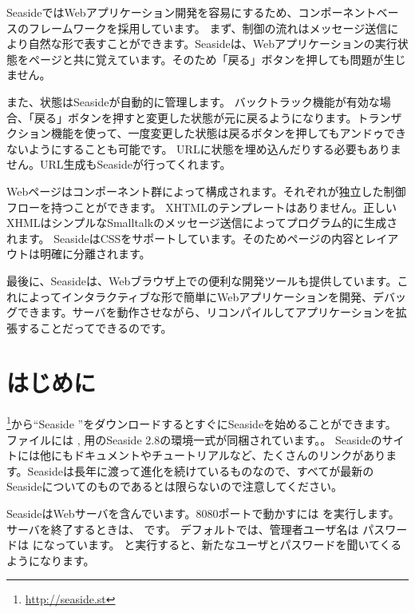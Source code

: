\documentclass[a4paper,10pt,twoside]{book}
\begin{document}
SeasideではWebアプリケーション開発を容易にするため、コンポーネントベースのフレームワークを採用しています。
まず、制御の流れはメッセージ送信により自然な形で表すことができます。Seasideは、Webアプリケーションの実行状態をページと共に覚えています。そのため「戻る」ボタンを押しても問題が生じません。

また、状態はSeasideが自動的に管理します。
バックトラック機能が有効な場合、「戻る」ボタンを押すと変更した状態が元に戻るようになります。トランザクション機能を使って、一度変更した状態は戻るボタンを押してもアンドゥできないようにすることも可能です。
URLに状態を埋め込んだりする必要もありません。URL生成もSeasideが行ってくれます。

Webページはコンポーネント群によって構成されます。それぞれが独立した制御フローを持つことができます。
XHTMLのテンプレートはありません。正しいXHMLはシンプルなSmalltalkのメッセージ送信によってプログラム的に生成されます。
SeasideはCSSをサポートしています。そのためページの内容とレイアウトは明確に分離されます。

最後に、Seasideは、Webブラウザ上での便利な開発ツールも提供しています。これによってインタラクティブな形で簡単にWebアプリケーションを開発、デバッグできます。サーバを動作させながら、リコンパイルしてアプリケーションを拡張することだってできるのです。
\section{はじめに}

\footnote{\url{http://seaside.st}}から``Seaside ''をダウンロードするとすぐにSeasideを始めることができます。
ファイルには ,  用のSeaside 2.8の環境一式が同梱されています。。
Seasideのサイトには他にもドキュメントやチュートリアルなど、たくさんのリンクがあります。Seasideは長年に渡って進化を続けているものなので、すべてが最新のSeasideについてのものであるとは限らないので注意してください。


SeasideはWebサーバを含んでいます。8080ポートで動かすには   を実行します。
サーバを終了するときは、 です。
デフォルトでは、管理者ユーザ名は  パスワードは になっています。
   と実行すると、新たなユーザとパスワードを聞いてくるようになります。
\end{document}
